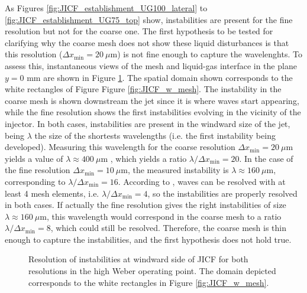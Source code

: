 As Figures \ref{fig:JICF_establishment_UG100_lateral} to \ref{fig:JICF_establishment_UG75_top} show, instabilities are present for the fine resolution but not for the coarse one. The first hypothesis to be tested for clarifying why the coarse mesh does not show these liquid disturbances is that this resolution ($\Delta x_\mathrm{min} = 20~\mu$m) is not fine enough to capture the wavelenghts. To assess this, instantaneous views of the mesh and liquid-gas interface in the plane $y = 0$ mm are shown in Figure \ref{fig:JICF_instabilities_lambda}. The spatial domain shown corresponds to the white rectangles of Figure Figure \ref{fig:JICF_w_mesh}. The instability in the coarse mesh is shown downstream the jet since it is where waves start appearing, while the fine resolution shows the first instabilities evolving in the vicinity of the injector. In both cases, instabilities are present in the windward size of the jet, being $\lambda$ the size of the shortests wavelengths (i.e. the first instability being developed). Measuring this wavelength for the coarse resolution $\Delta x_\mathrm{min} = 20~\mu$m yields a value of $\lambda \approx 400 ~ \mu$m , which yields a ratio $\lambda / \Delta x_\mathrm{min} = 20$. In the case of the fine resolution $\Delta x_\mathrm{min} = 10~\mu$m, the measured instability is $\lambda \approx 160 ~ \mu$m, corresponding to $\lambda / \Delta x_\mathrm{min} = 16$.  According to , waves can be resolved with at least 4 mesh elements, i.e.  $\lambda / \Delta x_\mathrm{min} = 4$, so the instabilities are properly resolved in both cases. If actually the fine resolution gives the right instabilities of size $\lambda \approx 160 ~ \mu$m, this wavelength would correspond in the coarse mesh to a ratio $\lambda / \Delta x_\mathrm{min} = 8$, which could still be resolved. Therefore, the coarse mesh is thin enough to capture the instabilities, and the first hypothesis does not hold true.


\begin{figure}[ht]
\centering
{}
\caption[Resolution of instabilities at windward side of JICF for both resolutions in the high Weber operating point.]{Resolution of instabilities at windward side of JICF for both resolutions in the high Weber operating point. The domain depicted corresponds to the white rectangles in Figure \ref{fig:JICF_w_mesh}. }
\label{fig:JICF_instabilities_lambda}
\end{figure}

